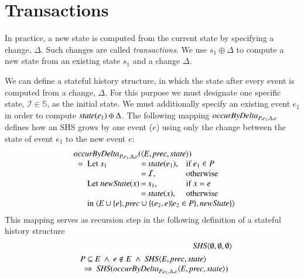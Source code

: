 \documentclass{elsarticle}
\def\id#1{\text{\it #1\/}}
\def\Events{{\mathit E}}
\begin{document}
\section{Transactions}
\label{sct:Transactions}
	In practice, a new state is computed from the current state by specifying a change, $\Delta$.
	Such changes are called {\em transactions}.
	We use $s_1\oplus\Delta$ to compute a new state from an existing state $s_1$ and a change $\Delta$.

	We can define a stateful history structure,
	in which the state after every event is computed from a change, $\Delta$.
	For this purpose we must designate one specific state, $\mathcal I\in\mathbb S$, as the initial state.
	We must additionally specify an existing event $e_1$ in order to compute $\id{state}(e_1)\oplus\Delta$.
	The following mapping $\id{occurByDelta}_{P,e_1,\Delta,e}$ defines how an SHS grows by one event ($e$)
	using only the change between the state of event $e_1$ to the new event $e$:
\begin{eqnarray}
&&\begin{array}{l}
	\id{occurByDelta}_{P,e_1,\Delta,e}(\la\Events, \id{prec}, \id{state}\ra)\\
	\ \ =\ \begin{array}[t]{@{}l@{\hspace{.2em}}c@{\hspace{.2em}}ll}
		\text{Let }s_1&=&\id{state}(e_1)\text{,}&\text{if }e_1\in P\\
				&=&\mathcal I\text{,}&\text{otherwise}\\
		\text{Let }\id{newState}(x)&=&s_1\text{,}&\text{if }x=e\\
		&=&\id{state}(x)\text{,}&\text{otherwise}\\
		\multicolumn{4}{@{}l}{\text{in }\la\Events\cup\{e\}, \id{prec}\cup\{(e_2,e)|e_2\in P\}, \id{newState}\}\ra}
		\end{array}
\end{array}
\label{req:SHS by Delta}
\end{eqnarray}
	This mapping serves as recursion step in the following definition of a stateful history structure
\begin{eqnarray}
	&&\id{SHS}\la \emptyset, \emptyset, \emptyset\ra\\
&&\begin{array}{@{}l}
	P\subseteq\Events\ \wedge\ e\notin E\ \wedge\ \id{SHS}\la \Events, \id{prec}, \id{state}\ra\\
	\ \ \Rightarrow\ \id{SHS}(\id{occurByDelta}_{P,e_1,\Delta,e}\la \Events, \id{prec}, \id{state}\ra)
\end{array}
\label{req:recursive def SHS by Delta}
\end{eqnarray}
\end{document}

